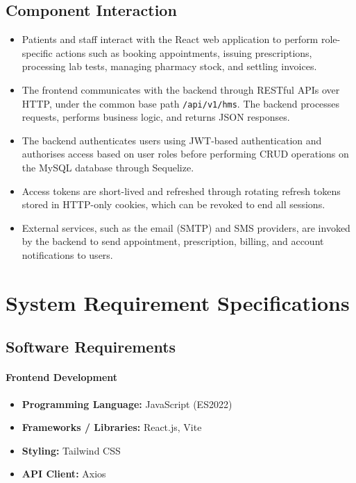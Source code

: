 \documentclass[12pt,a4paper]{report}
\begin{document}
\subsection{Component Interaction}
\begin{itemize}[leftmargin=1.4em]
  \item Patients and staff interact with the React web application to perform
        role-specific actions such as booking appointments, issuing prescriptions,
        processing lab tests, managing pharmacy stock, and settling invoices.
  \item The frontend communicates with the backend through RESTful APIs over HTTP,
        under the common base path \texttt{/api/v1/hms}. The backend processes
        requests, performs business logic, and returns JSON responses.
  \item The backend authenticates users using JWT-based authentication and authorises
        access based on user roles before performing CRUD operations on the MySQL
        database through Sequelize.
  \item Access tokens are short-lived and refreshed through rotating refresh tokens
        stored in HTTP-only cookies, which can be revoked to end all sessions.
  \item External services, such as the email (SMTP) and SMS providers, are invoked by
        the backend to send appointment, prescription, billing, and account
        notifications to users.
\end{itemize}

\section{System Requirement Specifications}

\subsection{Software Requirements}
\paragraph{Frontend Development}
\begin{itemize}[leftmargin=1.4em, itemsep=0pt]
  \item \textbf{Programming Language:} JavaScript (ES2022)
  \item \textbf{Frameworks / Libraries:} React.js, Vite
  \item \textbf{Styling:} Tailwind CSS
  \item \textbf{API Client:} Axios
\end{itemize}
\end{document}
